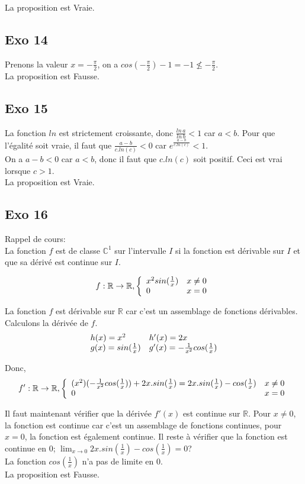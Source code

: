 \documentclass[]{book}
\theoremstyle{definition}
\newcommand{\bb}[1]{\mathbb{#1}}
\newcommand{\R}{\bb{R}}
\newcommand{\C}{\bb{C}}
\begin{document}
La proposition est Vraie.

\subsection*{Exo 14}
Prenons la valeur $x = -\frac{\pi}{2}$, on a $cos(-\frac{\pi}{2})-1 = -1 \nleq -\frac{\pi}{2}$.\\


La proposition est Fausse.


\subsection*{Exo 15}
La fonction $ln$ est strictement croissante, donc $\frac{ln\,a}{ln\,b} < 1$ car $a<b$. Pour que l'\'egalit\'e soit vraie, il faut que $\frac{a-b}{c.ln(c)} < 0$ car $e^{\frac{a-b}{c.ln(c)}} < 1$.\\
On a $a-b < 0$ car $a<b$, donc il faut que $c.ln(c)$ soit positif. Ceci est vrai lorsque $c > 1$.\\


La proposition est Vraie.


\subsection*{Exo 16}
Rappel de cours:\\
La fonction $f$ est de classe $\C^1$ sur l'intervalle $I$ si la fonction est d\'erivable sur $I$ et que sa d\'eriv\'e est continue sur $I$.

$$f: \R \to \R,
\left\{ 
\begin{array}{l l}
 x^2sin(\frac{1}{x}) & x \neq 0\\
 0 & x = 0\\
\end{array}
\right. 
$$

La fonction $f$ est d\'erivable sur $\R$ car c'est un assemblage de fonctions d\'erivables. Calculons la d\'eriv\'ee de $f$.
$$
\begin{array}{l l}
 h(x) = x^2 & h'(x)= 2x\\
 g(x) = sin(\frac{1}{x}) & g'(x)= -\frac{1}{x^2}cos(\frac{1}{x})\\
\end{array}
$$

Donc,
$$f': \R \to \R,
\left\{ 
\begin{array}{l l}
 (x^2)(-\frac{1}{x^2}cos(\frac{1}{x})) + 2x.sin(\frac{1}{x}) = 2x.sin(\frac{1}{x}) - cos(\frac{1}{x})& x \neq 0\\
 0 & x = 0\\
\end{array}
\right. 
$$

Il faut maintenant v\'erifier que la d\'eriv\'ee $f'(x)$ est continue sur $\R$. Pour $x \neq 0$, la fonction est continue car c'est un assemblage de fonctions continues, pour $x=0$, la fonction est \'egalement continue. Il reste \`a v\'erifier que la fonction est continue en $0$; $\lim_{x \to 0} 2x.sin(\frac{1}{x}) - cos(\frac{1}{x}) = 0$?\\

La fonction $cos(\frac{1}{x})$ n'a pas de limite en $0$.\\

La proposition est Fausse.
\end{document}

